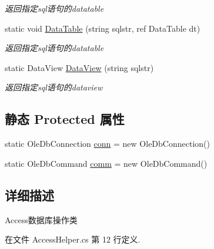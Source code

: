 \begin{DoxyCompactItemize}
\begin{DoxyCompactList}\small\item\em 返回指定sql语句的datatable \end{DoxyCompactList}\item 
static void \hyperlink{class_x_c_l_net_tools_1_1_data_base_1_1_access_1_1_access_helper_a4ee3cbd4a9212d6df954c2228c2ff2f4}{Data\-Table} (string sqlstr, ref Data\-Table dt)
\begin{DoxyCompactList}\small\item\em 返回指定sql语句的datatable \end{DoxyCompactList}\item 
static Data\-View \hyperlink{class_x_c_l_net_tools_1_1_data_base_1_1_access_1_1_access_helper_a3979a6d17790d9ecc1cc9c4bcf56de84}{Data\-View} (string sqlstr)
\begin{DoxyCompactList}\small\item\em 返回指定sql语句的dataview \end{DoxyCompactList}\end{DoxyCompactItemize}
\subsection*{静态 Protected 属性}
\begin{DoxyCompactItemize}
\item 
static Ole\-Db\-Connection \hyperlink{class_x_c_l_net_tools_1_1_data_base_1_1_access_1_1_access_helper_a6eacbf7cab97849252853ed926ffeb7e}{conn} = new Ole\-Db\-Connection()
\item 
static Ole\-Db\-Command \hyperlink{class_x_c_l_net_tools_1_1_data_base_1_1_access_1_1_access_helper_a11c37781255094b6abb069cf0b5c65df}{comm} = new Ole\-Db\-Command()
\end{DoxyCompactItemize}


\subsection{详细描述}
Access数据库操作类 



在文件 Access\-Helper.\-cs 第 12 行定义.



